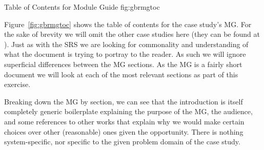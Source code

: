 {Table of Contents for \gb{} Module Guide}
{fig:gbrmgtoc}

Figure~\ref{fig:gbrmgtoc} shows the table of contents for the \gb{} case 
study's MG. For the sake of brevity we will omit the other case studies 
here (they can be found at ). Just as with the SRS we are looking for 
commonality and understanding of what the document is trying to portray to the 
reader. As such we will ignore superficial differences between the MG sections. 
As the MG is a fairly short document we will look at each of the most relevant 
sections as part of this exercise.

Breaking down the MG by section, we can see that the introduction is itself 
completely generic boilerplate explaining the purpose of the MG, the audience, 
and some references to other works that explain why we would make certain 
choices over other (reasonable) ones given the opportunity. There is nothing 
system-specific, nor specific to the given problem domain of the case study.


